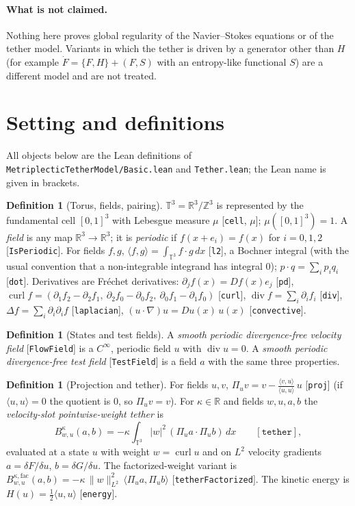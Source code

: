 \documentclass[11pt,a4paper]{article}
\theoremstyle{definition}
\newtheorem{definition}[theorem]{Definition}
\theoremstyle{remark}
\newcommand{\T}{\mathbb{T}^3}
\newcommand{\R}{\mathbb{R}}
\newcommand{\ip}[2]{\langle #1,#2\rangle}
\newcommand{\lean}[1]{\texttt{#1}}
\begin{document}
\paragraph{What is not claimed.} Nothing here proves global regularity of the Navier--Stokes
equations or of the tether model. Variants in which the tether is driven by a generator other
than $H$ (for example $\dot F=\{F,H\}+(F,S)$ with an entropy-like functional $S$) are a different
model and are not treated.

\section{Setting and definitions}\label{sec:defs}

All objects below are the Lean definitions of \lean{MetriplecticTetherModel/Basic.lean} and
\lean{Tether.lean}; the Lean name is given in brackets.

\begin{definition}[Torus, fields, pairing]\label{def:torus}
$\T=\R^3/\mathbb{Z}^3$ is represented by the fundamental cell $[0,1]^3$ with Lebesgue
measure $\mu$ [\lean{cell}, \lean{$\mu$}]; $\mu([0,1]^3)=1$. A \emph{field} is any map
$\R^3\to\R^3$; it is \emph{periodic} if $f(x+e_i)=f(x)$ for $i=0,1,2$ [\lean{IsPeriodic}].
For fields $f,g$, $\ip fg=\int_{\T}f\cdot g\,dx$ [\lean{l2}], a Bochner integral (with
the usual convention that a non-integrable integrand has integral $0$); $p\cdot q=\sum_i p_iq_i$
[\lean{dot}]. Derivatives are Fr\'echet derivatives: $\partial_j f(x)=Df(x)e_j$ [\lean{pd}],
$\operatorname{curl}f=(\partial_1f_2-\partial_2f_1,\ \partial_2f_0-\partial_0f_2,\
\partial_0f_1-\partial_1f_0)$ [\lean{curl}], $\operatorname{div}f=\sum_i\partial_if_i$
[\lean{div}], $\Delta f=\sum_i\partial_i\partial_if$ [\lean{laplacian}],
$(u\cdot\nabla)u=Du(x)\,u(x)$ [\lean{convective}].
\end{definition}

\begin{definition}[States and test fields]
A \emph{smooth periodic divergence-free velocity field} [\lean{FlowField}] is a $C^\infty$,
periodic field $u$ with $\operatorname{div}u=0$. A \emph{smooth periodic divergence-free test
field} [\lean{TestField}] is a field $a$ with the same three properties.
\end{definition}

\begin{definition}[Projection and tether]\label{def:tether}
For fields $u,v$, $\Pi_u v=v-\frac{\ip vu}{\ip uu}\,u$ [\lean{proj}] (if $\ip uu=0$ the quotient
is $0$, so $\Pi_uv=v$). For $\kappa\in\R$ and fields $w,u,a,b$ the \emph{velocity-slot
pointwise-weight tether} is
\[
B^\kappa_{w,u}(a,b)=-\kappa\int_{\T}|w|^2\,(\Pi_ua\cdot\Pi_ub)\,dx\qquad[\lean{tether}],
\]
evaluated at a state $u$ with weight $w=\operatorname{curl}u$ and on $L^2$ velocity gradients
$a=\delta F/\delta u$, $b=\delta G/\delta u$. The factorized-weight variant is
$B^{\kappa,\mathrm{fac}}_{w,u}(a,b)=-\kappa\,\|w\|_{L^2}^2\,\ip{\Pi_ua}{\Pi_ub}$
[\lean{tetherFactorized}]. The kinetic energy is $H(u)=\frac12\ip uu$ [\lean{energy}].
\end{definition}
\end{document}
